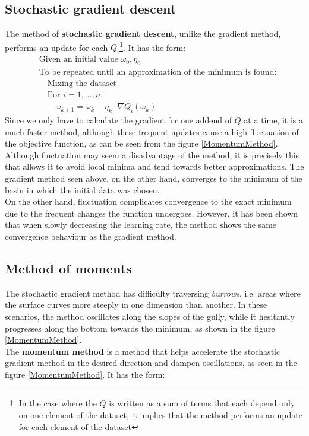 \subsection{Stochastic gradient descent \cite{bottou2012stochastic}}
The method of \textbf{stochastic gradient descent}, unlike the gradient method, performs an update for each $Q_i$\footnote{In the case where the $Q$ is written as a sum of terms that each depend only on one element of the dataset, it implies that the method performs an update for each element of the dataset}. It has the form:
\begin{align*}
    &\text{Given an initial value }\omega_0, \eta_0\\
    &\text{To be repeated until an approximation of the minimum is found:}\\
    &\quad\text{Mixing the dataset}\\
    &\quad\text{For }i=1,...,n:\\
    &\quad\quad\omega_{k+1}=\omega_k -\eta_k\cdot \nabla Q_i(\omega_k)
\end{align*}
Since we only have to calculate the gradient for one addend of $Q$ at a time, it is a much faster method, although these frequent updates cause a high fluctuation of the objective function, as can be seen from the figure \ref{MomentumMethod}.\\
Although fluctuation may seem a disadvantage of the method, it is precisely this that allows it to avoid local minima and tend towards better approximations. The gradient method seen above, on the other hand, converges to the minimum of the basin in which the initial data was chosen.\\
On the other hand, fluctuation complicates convergence to the exact minimum due to the frequent changes the function undergoes. However, it has been shown that when slowly decreasing the learning rate, the method shows the same convergence behaviour as the gradient method. 


\newpage
\subsection{Method of moments \cite{ruder_2022}}
The stochastic gradient method has difficulty traversing \textit{burrows}, i.e. areas where the surface curves more steeply in one dimension than another. In these scenarios, the method oscillates along the slopes of the gully, while it hesitantly progresses along the bottom towards the minimum, as shown in the figure \ref{MomentumMethod}.\\
The \textbf{momentum method} is a method that helps accelerate the stochastic gradient method in the desired direction and dampen oscillations, as seen in the figure \ref{MomentumMethod}. It has the form:

